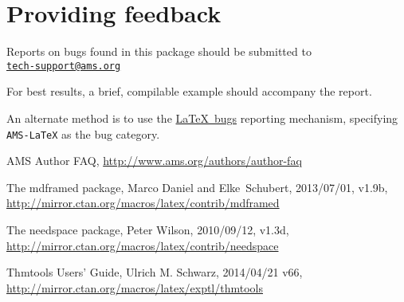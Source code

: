 \documentclass[11pt,twoside]{article}
\newcommand{\ntt}{%
  \fontfamily\ttdefault \fontseries\mddefault \fontshape\updefault
  \selectfont
}
\DeclareRobustCommand{\pkg}[1]{{\ntt#1}}
\begin{document}

\section{Providing feedback}

Reports on bugs found in this package should be submitted to\\
 \null\hfil \href{mailto:tech-support@ams.org}{\texttt{tech-support@ams.org}}

\noindent
For best results, a brief, compilable example should accompany the report.

An alternate method is to use the
  \href{http://latex-project.org/bugs-upload.html}{\LaTeX\ bugs}
  reporting mechanism, specifying \texttt{AMS-LaTeX} as the bug category.


\begin{thebibliography}{[MDF]}

\raggedright

 AMS Author FAQ,
  \url{http://www.ams.org/authors/author-faq}

 The \pkg{mdframed} package,
  Marco Daniel and Elke~Schubert, 2013/07/01, v1.9b,
  \url{http://mirror.ctan.org/macros/latex/contrib/mdframed}

 The \pkg{needspace} package,
  Peter Wilson, 2010/09/12, v1.3d,
  \url{http://mirror.ctan.org/macros/latex/contrib/needspace}

 \pkg{Thmtools} Users' Guide,
  Ulrich M. Schwarz, 2014/04/21 v66,
  \url{http://mirror.ctan.org/macros/latex/exptl/thmtools}

\end{thebibliography}
\end{document}
